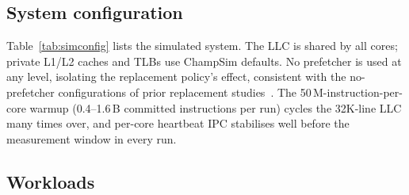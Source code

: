 \documentclass[conference]{IEEEtran}
\begin{document}
\subsection{System configuration}

Table~\ref{tab:simconfig} lists the simulated system. The LLC is shared by all cores; private L1/L2 caches and TLBs use ChampSim defaults. No prefetcher is used at any level, isolating the replacement policy's effect, consistent with the no-prefetcher configurations of prior replacement studies~\cite{jain2016hawkeye,shah2022mockingjay}. The 50\,M-instruction-per-core warmup (0.4--1.6\,B committed instructions per run) cycles the 32K-line LLC many times over, and per-core heartbeat IPC stabilises well before the measurement window in every run.

\begin{table}[htbp]
    \centering
    \caption{Simulation Configuration}
    \label{tab:simconfig}
\end{table}

\subsection{Workloads}
\end{document}
